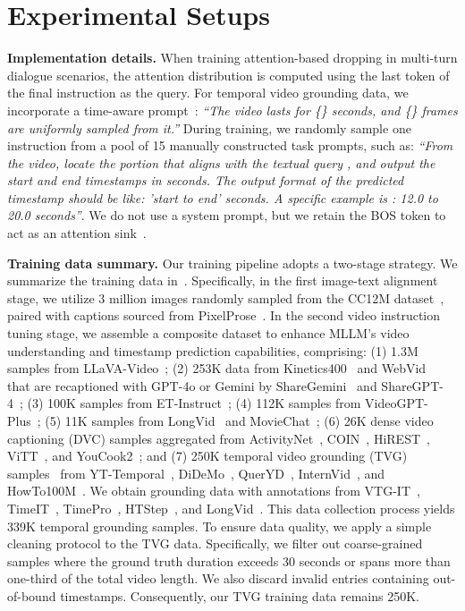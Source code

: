 \documentclass[10pt,twocolumn,letterpaper]{article}
\begin{document}
\section{Experimental Setups}
\noindent\textbf{Implementation details.}
When training attention-based dropping in multi-turn dialogue scenarios, the attention distribution is computed using the last token of the final instruction as the query.
For temporal video grounding data, we incorporate a time-aware prompt~\cite{li2024videochatflash}: \textit{``The video lasts for \{\} seconds, and \{\} frames are uniformly sampled from it.''} 
During training, we randomly sample one instruction from a pool of 15 manually constructed task prompts, such as: \textit{``From the video, locate the portion that aligns with the textual query {}, and output the start and end timestamps in seconds. The output format of the predicted timestamp should be like: 'start to end' seconds. A specific example is : 12.0 to 20.0 seconds''}. 
We do not use a system prompt, but we retain the BOS token to act as an attention sink~\cite{xiao2024attentionsink}.

\noindent\textbf{Training data summary.}
Our training pipeline adopts a two-stage strategy.
We summarize the training data in~.
Specifically, in the first image-text alignment stage, we utilize 3 million images randomly sampled from the CC12M dataset~\cite{changpinyo2021cc12m}, paired with captions sourced from PixelProse~\cite{singla2024pixelprose}.
In the second video instruction tuning stage, we assemble a composite dataset to enhance MLLM's video understanding and timestamp prediction capabilities, comprising: 
(1) 1.3M samples from LLaVA-Video~\cite{zhang2025llavavideo};
(2) 253K data from Kinetics400~\cite{carreira2017k400} and WebVid~\cite{bain2021webvid} that are recaptioned with GPT-4o or Gemini by ShareGemini~\cite{sharegemini} and ShareGPT-4~\cite{chen2024sharegpt4video};
(3) 100K samples from ET-Instruct~\cite{liu2024etbench}; 
(4) 112K samples from VideoGPT-Plus~\cite{Maaz2024VideoGPT+};
(5) 11K samples from LongVid~\cite{li2024videochatflash} and MovieChat~\cite{song2024moviechat};
(6) 26K dense video captioning (DVC) samples aggregated from ActivityNet~\cite{caba2015activitynet}, COIN~\cite{tang2019coin}, HiREST~\cite{zala2023hirest}, ViTT~\cite{huang2020vitt}, and YouCook2~\cite{zhou2018youcook2};
and (7) 250K temporal video grounding (TVG) samples~\cite{wang2025timer1} from YT-Temporal~\cite{yang2023vid2seq}, DiDeMo~\cite{anne2017didemo}, QuerYD~\cite{oncescu2021queryd}, InternVid~\cite{wang2024internvid}, and HowTo100M~\cite{miech2019howto100m}. 
We obtain grounding data with annotations from VTG-IT~\cite{guo2025vtgllm}, TimeIT~\cite{ren2024timechat}, TimePro~\cite{zeng2025timesuite}, HTStep~\cite{afouras2023htstep}, and LongVid~\cite{li2024videochatflash}.
This data collection process yields 339K temporal grounding samples. 
To ensure data quality, we apply a simple cleaning protocol to the TVG data. 
Specifically, we filter out coarse-grained samples where the ground truth duration exceeds 30 seconds or spans more than one-third of the total video length. 
We also discard invalid entries containing out-of-bound timestamps.
Consequently, our TVG training data remains 250K.
\end{document}
